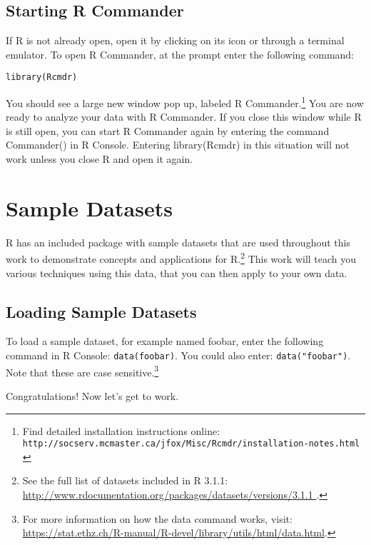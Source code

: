 \subsection{Starting R Commander}
If R is not already open, open it by clicking on its icon or through a 
terminal emulator. To open R Commander, at the prompt enter the following 
command:

\texttt{library(Rcmdr)}

You should see a large new window pop up, labeled R Commander.\footnote{Find 
detailed installation instructions online: \texttt{http://socserv.mcmaster.ca/jfox/Misc/Rcmdr/installation-notes.html
}} You are now ready to analyze your data with R Commander. If you close this 
window while R is still open, you can start R Commander again by entering the 
command Commander() in R Console. Entering library(Rcmdr) in this situation 
will not work unless you close R and open it again.

\section{Sample Datasets}
R has an included package with sample datasets that are used throughout this 
work to demonstrate concepts and applications for R.\footnote{See the full list
 of datasets included in R 3.1.1: \url{http://www.rdocumentation.org/packages/datasets/versions/3.1.1
}.} This work will teach you various techniques using this data, that you can 
then apply to your own data.

\subsection{Loading Sample Datasets}
To load a sample dataset, for example named foobar, enter the following command
 in R Console: \texttt{data(foobar)}. You could also enter: 
\texttt{data("foobar")}. Note that these are case sensitive.\footnote{For more 
information on how the data command works, visit: \url{https://stat.ethz.ch/R-manual/R-devel/library/utils/html/data.html}.}

Congratulations! Now let's get to work.